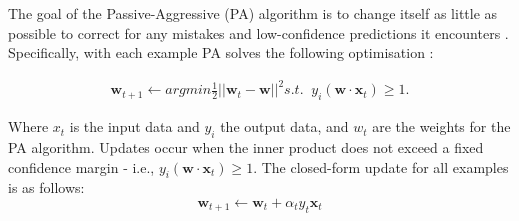 \documentclass[final,3p,times,twocolumn,numbers]{elsarticle}
\begin{document}

%
%
%
%


The goal of the Passive-Aggressive (PA) algorithm is to change itself as little as possible to correct for any mistakes and low-confidence predictions it encounters \cite{Gzik2014}. Specifically, with each example PA solves the following optimisation \cite{Ma2009}:

\begin{align}
    \boldsymbol{w}_{t+1}\leftarrow argmin \frac{1}{2}\left|\left|{\boldsymbol{w}_t-\boldsymbol{w}}\right|\right|^2 
    s.t. \; \; y_i(\boldsymbol{w}\cdot \boldsymbol{x}_t)\geq1.
\end{align}

\noindent Where $x_t$ is the input data and $y_i$ the output data, and $w_t$ are the weights for the PA algorithm. Updates occur when the inner product does not exceed a fixed confidence margin - i.e., $y_i(\boldsymbol{w}\cdot \boldsymbol{x}_t)\geq1$. The closed-form update for all examples is as follows:
\begin{equation}
    \boldsymbol{w}_{t+1}\leftarrow \boldsymbol{w}_{t} + \alpha_t y_t \boldsymbol{x}_t
\end{equation}
\end{document}

